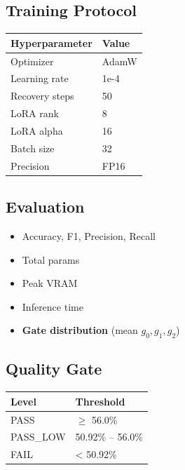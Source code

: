 \subsection{Training Protocol}

\begin{table}[H]
\centering
\small
\begin{tabular}{ll}
\toprule
\textbf{Hyperparameter} & \textbf{Value} \\
\midrule
Optimizer & AdamW \\
Learning rate & 1e-4 \\
Recovery steps & 50 \\
LoRA rank & 8 \\
LoRA alpha & 16 \\
Batch size & 32 \\
Precision & FP16 \\
\bottomrule
\end{tabular}
\end{table}

\subsection{Evaluation}

\begin{itemize}
\item Accuracy, F1, Precision, Recall
\item Total params
\item Peak VRAM
\item Inference time
\item \textbf{Gate distribution} (mean $g_0, g_1, g_2$)

\end{itemize}
\subsection{Quality Gate}

\begin{table}[H]
\centering
\small
\begin{tabular}{ll}
\toprule
\textbf{Level} & \textbf{Threshold} \\
\midrule
PASS & $\ge$ 56.0\% \\
PASS\_LOW & 50.92\% -- 56.0\% \\
FAIL & \textless{} 50.92\% \\
\bottomrule
\end{tabular}
\end{table}

